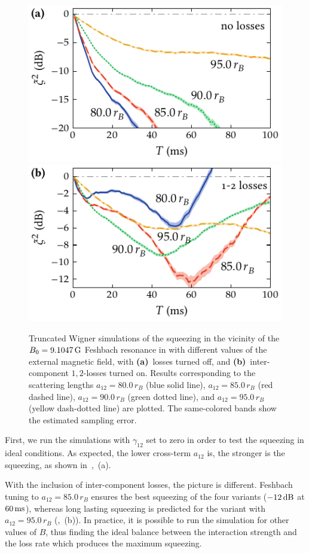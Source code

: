 \begin{figure}
    \centerline{%
    \includegraphics{figures_generated/bec_squeezing/feshbach_squeezing_no_losses.pdf}%
    \includegraphics{figures_generated/bec_squeezing/feshbach_squeezing.pdf}}

    \caption[Spin squeezing near a Feshbach resonance]{
    Truncated Wigner simulations of the squeezing in the vicinity of the $B_0 = 9.1047\mbox{\ensuremath{\,\mathrm{G}}}$ Feshbach resonance in \Rb{} with different values of the external magnetic field, with \textbf{(a)}~losses turned off, and \textbf{(b)}~inter-component $1,2$-losses turned on.
    Results corresponding to the scattering lengths $a_{12}=80.0\,r_B$ (blue solid line), $a_{12}=85.0\,r_B$ (red dashed line), $a_{12}=90.0\,r_B$ (green dotted line), and $a_{12}=95.0\,r_B$ (yellow dash-dotted line) are plotted.
    The same-colored bands show the estimated sampling error.}%

    \label{fig:bec-squeezing:feshbach:squeezing}
\end{figure}

First, we run the simulations with $\gamma_{12}$ set to zero in order to test the squeezing in ideal conditions.
As expected, the lower cross-term $a_{12}$ is, the stronger is the squeezing, as shown in~,~(a).

With the inclusion of inter-component losses, the picture is different.
Feshbach tuning to $a_{12} = 85.0\,r_B$ ensures the best squeezing of the four variants ($-12\mbox{\ensuremath{\,\mathrm{dB}}}$ at $60\mbox{\ensuremath{\,\mathrm{ms}}}$), whereas long lasting squeezing is predicted for the variant with $a_{12} = 95.0\,r_B$ (,~(b)).
In practice, it is possible to run the simulation for other values of $B$, thus finding the ideal balance between the interaction strength and the loss rate which produces the maximum squeezing.
